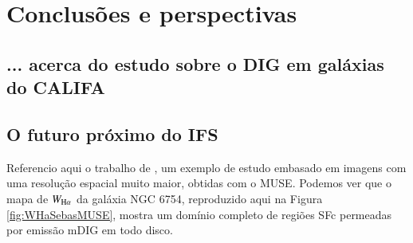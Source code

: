 
\chapter{Conclusões e perspectivas}
\label{sec:concl}

\section{... acerca do estudo sobre o DIG em galáxias do CALIFA}
\label{sec:concl:DIG}


\section{O futuro próximo do IFS}
\label{sec:concl:futIFS}

Referencio aqui o trabalho de \citet{Sanchez.etal.2015MUSE}, um exemplo de estudo embasado em imagens com uma resolução espacial muito maior, obtidas com o MUSE. Podemos ver que o mapa de $W_{\Ha}$ da galáxia NGC 6754, reproduzido aqui na Figura \ref{fig:WHaSebasMUSE}, mostra um domínio completo de regiões SFc permeadas por emissão mDIG em todo disco.

